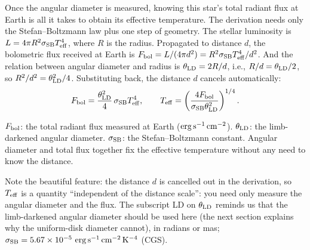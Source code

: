 Once the angular diameter is measured, knowing this star's total radiant flux at Earth is all it takes to obtain its effective temperature. The derivation needs only the Stefan--Boltzmann law plus one step of geometry. The stellar luminosity is \(L=4\pi R^2\sigma_{\rm SB}T_{\rm eff}^4\), where \(R\) is the radius. Propagated to distance \(d\), the bolometric flux received at Earth is \(F_{\rm bol}=L/(4\pi d^2)=R^2\sigma_{\rm SB}T_{\rm eff}^4/d^2\). And the relation between angular diameter and radius is \(\theta_{\rm LD}=2R/d\), i.e., \(R/d=\theta_{\rm LD}/2\), so \(R^2/d^2=\theta_{\rm LD}^2/4\). Substituting back, the distance \(d\) cancels automatically:
\begin{equation}
  F_{\rm bol}=\frac{\theta_{\rm LD}^2}{4}\,\sigma_{\rm SB}T_{\rm eff}^4,
  \qquad
  T_{\rm eff}=\left(\frac{4F_{\rm bol}}{\sigma_{\rm SB}\theta_{\rm LD}^2}\right)^{1/4}.
  \label{eq:e17-teff}
\end{equation}
\begin{formulaexplain}
\(F_{\rm bol}\): the total radiant flux measured at Earth (\({\rm erg\,s^{-1}\,cm^{-2}}\)). \(\theta_{\rm LD}\): the limb-darkened angular diameter. \(\sigma_{\rm SB}\): the Stefan--Boltzmann constant. Angular diameter and total flux together fix the effective temperature without any need to know the distance.
\end{formulaexplain}
Note the beautiful feature: the distance \(d\) is cancelled out in the derivation, so \(T_{\rm eff}\) is a quantity ``independent of the distance scale'': you need only measure the angular diameter and the flux. The subscript LD on \(\theta_{\rm LD}\) reminds us that the limb-darkened angular diameter should be used here (the next section explains why the uniform-disk diameter cannot), in radians or mas; \(\sigma_{\rm SB}=5.67\times10^{-5}~{\rm erg\,s^{-1}\,cm^{-2}\,K^{-4}}\) (CGS).

